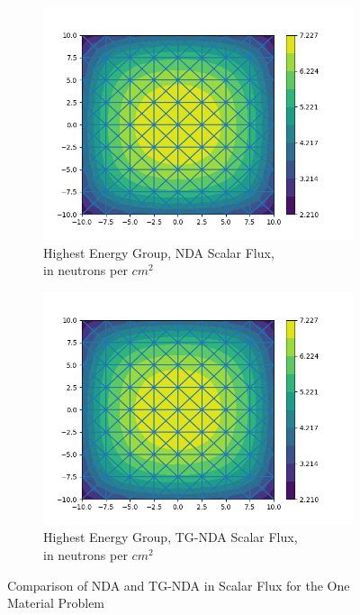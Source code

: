 \begin{figure}[H]
\centering
\begin{subfigure}{.5\textwidth}
  \centering
  \includegraphics[width=\linewidth]{fig/nda_c5g7mod_scalar_flux_group0.png}
  \caption{Highest Energy Group, NDA Scalar Flux, \\ in neutrons per $cm^2$}
  \label{fig:NDA-Mod}
\end{subfigure}%
\begin{subfigure}{.5\textwidth}
  \centering
  \includegraphics[width=\linewidth]{fig/tgnda_c5g7mod_scalar_flux_group0.png}
  \caption{Highest Energy Group, TG-NDA Scalar Flux, \\ in neutrons per $cm^2$}
  \label{fig:TG-NDA-Mod}
\end{subfigure}
\caption{Comparison of NDA and TG-NDA in Scalar Flux for the One Material Problem}
\label{fig:Moderator}
\end{figure}

